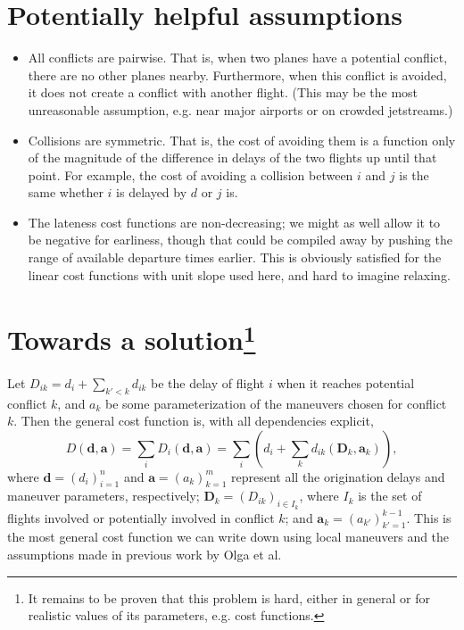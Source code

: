 \documentclass{article}
\begin{document}
\section{Potentially helpful assumptions}
\begin{itemize}
\item All conflicts are pairwise. That is, when two planes have a potential conflict, there are no other planes nearby. 
Furthermore, when this conflict is avoided, it does not create a conflict with another flight. 
(This may be the most unreasonable assumption, e.g. near major airports or on crowded jetstreams.)
\item Collisions are symmetric. That is, the cost of avoiding them is a function only of the magnitude of the difference in delays of the two flights up until that point. For example, the cost of avoiding a collision between $i$ and $j$ is the same whether $i$ is delayed by $d$ or $j$ is.
\item The lateness cost functions are non-decreasing; we might as well allow it to be negative for earliness, though that could be compiled away by pushing the range of available departure times earlier. This is obviously satisfied for the linear cost functions with unit slope used here, and hard to imagine relaxing.
\end{itemize}

\section[Towards a solution] {Towards a solution\footnote{
It remains to be proven that this problem is hard, either in general or for realistic values of its parameters, e.g. cost functions.}}

Let $D_{ik} = d_i + \sum_{k' < k} d_{ik}$ be the delay of flight $i$ when it reaches potential conflict $k$, and $a_k$ be some parameterization of the maneuvers chosen for conflict $k$.
Then the general cost function is, with all dependencies explicit,
\begin{equation*}
D(\mathbf d, \mathbf a) = \sum_i D_i(\mathbf d, \mathbf a)
= 
\sum_i \left(d_i + \sum_k d_{ik} (\mathbf D_{k}, \mathbf a_k)\right),
\end{equation*}
where $\mathbf d = (d_i)_{i=1}^n$ and $\mathbf a = (a_k)_{k=1}^m$ represent all the origination delays and maneuver parameters, respectively; $\mathbf D_k = (D_{ik})_{i \in I_k}$, where $I_k$ is the set of flights involved or potentially involved in conflict $k$; and $\mathbf a_k = (a_{k'})_{k'=1}^{k-1}$.
This is the most general cost function we can write down using local maneuvers and the assumptions made in previous work by Olga et al.
\end{document}
